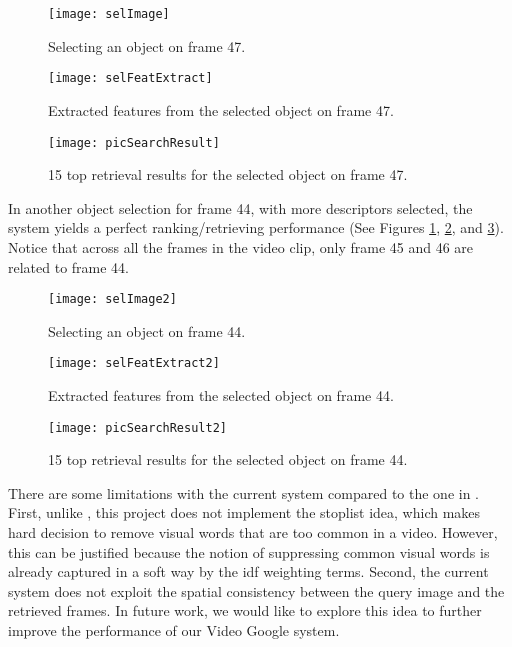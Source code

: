 \documentclass[conference]{IEEEtran}
\begin{document}
\begin{figure}[!t]
\centering
\texttt{[image: selImage]}
\caption{Selecting an object on frame 47.}
\label{fig:selImage}
\end{figure}

\begin{figure}[!t]
\centering
\texttt{[image: selFeatExtract]}
\caption{Extracted features from the selected object on frame 47.}
\label{fig:selFeatExtract}
\end{figure}

\begin{figure}[!t]
\centering
\texttt{[image: picSearchResult]}
\caption{15 top retrieval results for the selected object on frame 47.}
\label{fig:picSearchResult}
\end{figure}

In another object selection for frame 44, with more descriptors selected, the system yields a perfect ranking/retrieving performance (See Figures
\ref{fig:selImage}, \ref{fig:selFeatExtract}, and \ref{fig:picSearchResult}). 
Notice that across all the frames in the video clip, only frame 45 and 46 are related to frame 44.

\begin{figure}[!t]
\centering
\texttt{[image: selImage2]}
\caption{Selecting an object on frame 44.}
\label{fig:selImage2}
\end{figure}

\begin{figure}[!t]
\centering
\texttt{[image: selFeatExtract2]}
\caption{Extracted features from the selected object on frame 44.}
\label{fig:selFeatExtract2}
\end{figure}

\begin{figure}[!t]
\centering
\texttt{[image: picSearchResult2]}
\caption{15 top retrieval results for the selected object on frame 44.}
\label{fig:picSearchResult2}
\end{figure}

There are some limitations with the current system compared to the one in \cite{sivic2003video}. First,
unlike \cite{sivic2003video}, this project does not implement the stoplist idea, which makes hard decision to remove visual words that are too common 
in a video. However, this can be justified because the notion of suppressing common visual words is already captured in a soft way by the idf 
weighting terms. Second, the current system does not exploit the spatial consistency between the query image and the retrieved frames.
In future work, we would like to explore this idea to further improve the performance of our Video Google system.
\end{document}
